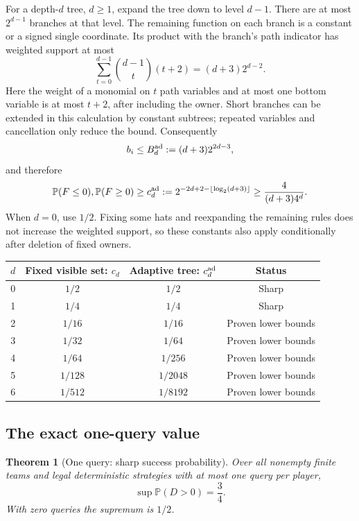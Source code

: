 \documentclass[11pt,letterpaper]{article}
\newtheorem{theorem}{Theorem}[section]
\theoremstyle{definition}
\newcommand{\Prb}{\mathbb P}
\begin{document}
For a depth-\(d\) tree, \(d\ge1\), expand the tree down to level \(d-1\).
There are at most \(2^{d-1}\) branches at that level. The remaining
function on each branch is a constant or a signed single coordinate.
Its product with the branch's path indicator has weighted support at most
\[
 \sum_{t=0}^{d-1}\binom{d-1}{t}(t+2)
 =(d+3)2^{d-2}.
\]
Here the weight of a monomial on \(t\) path variables and at most one
bottom variable is at most \(t+2\), after including the owner.
Short branches can be extended in this calculation by constant
subtrees; repeated variables and cancellation only reduce the bound.
Consequently
\[
 b_i\le B_d^{\rm ad}:=(d+3)2^{2d-3},
\]
and therefore
\begin{equation}
 \Prb(F\le0),\Prb(F\ge0)\ge
 c_d^{\rm ad}:=2^{-2d+2-\lfloor\log_2(d+3)\rfloor}
 \ge\frac{4}{(d+3)4^d}.
 \label{mbg:qry:eq:adaptive}
\end{equation}
When \(d=0\), use \(1/2\). Fixing some hats and reexpanding the
remaining rules does not increase the weighted support, so these
constants also apply conditionally after deletion of fixed owners.

\begin{center}
\begin{tabular}{c c c c}
\toprule
\(d\)& Fixed visible set: \(c_d\)& Adaptive tree: \(c_d^{\rm ad}\)& Status\\
\midrule
0&\(1/2\)&\(1/2\)&Sharp\\
1&\(1/4\)&\(1/4\)&Sharp\\
2&\(1/16\)&\(1/16\)&Proven lower bounds\\
3&\(1/32\)&\(1/64\)&Proven lower bounds\\
4&\(1/64\)&\(1/256\)&Proven lower bounds\\
5&\(1/128\)&\(1/2048\)&Proven lower bounds\\
6&\(1/512\)&\(1/8192\)&Proven lower bounds\\
\bottomrule
\end{tabular}
\end{center}

\subsection{The exact one-query value}

\begin{theorem}[One query: sharp success probability]
\label{mbg:qry:thm:onequery}
Over all nonempty finite teams and legal deterministic strategies with
at most one query per player,
\[
 \sup\Prb(D>0)=\frac34.
\]
With zero queries the supremum is \(1/2\).
\end{theorem}
\end{document}
